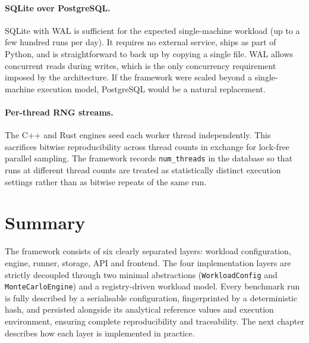 \paragraph{SQLite over PostgreSQL.}
SQLite with WAL is sufficient for the expected single-machine workload (up to a
few hundred runs per day). It requires no external service, ships as part of
Python, and is straightforward to back up by copying a single file. WAL allows
concurrent reads during writes, which is the only concurrency requirement
imposed by the architecture. If the framework were scaled beyond a
single-machine execution model, PostgreSQL would be a natural replacement.

\paragraph{Per-thread RNG streams.}
The C++ and Rust engines seed each worker thread independently. This sacrifices
bitwise reproducibility across thread counts in exchange for lock-free parallel
sampling. The framework records \texttt{num\_threads} in the database so that
runs at different thread counts are treated as statistically distinct execution
settings rather than as bitwise repeats of the same run.

\section{Summary}
\label{sec:design-summary}

The framework consists of six clearly separated layers: workload configuration,
engine, runner, storage, API and frontend. The four implementation layers are
strictly decoupled through two minimal abstractions
(\texttt{WorkloadConfig} and \texttt{MonteCarloEngine}) and a registry-driven
workload model. Every benchmark run is fully described by a serialisable
configuration, fingerprinted by a deterministic hash, and persisted alongside its
analytical reference values and execution environment, ensuring complete
reproducibility and traceability. The next chapter describes how each layer is
implemented in practice.
